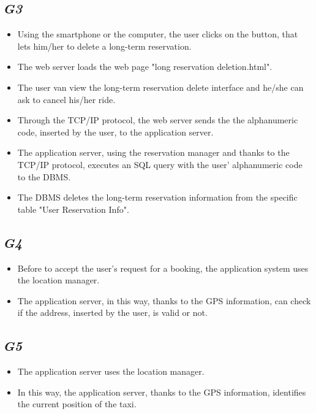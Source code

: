 	\subsection {\emph{G3}}
		\begin{itemize}
			\item Using the smartphone or the computer, the user clicks on the button, that lets him/her to delete a long-term reservation.
			\item The web server loads the web page "long reservation deletion.html".
			\item The user van view the long-term reservation delete interface and he/she can ask to cancel his/her ride.
			\item Through the TCP/IP protocol, the web server sends the the alphanumeric code, inserted by the user, to the application server.
			\item The application server, using the reservation manager and thanks to the TCP/IP protocol, executes an SQL query with the user' alphanumeric code to the DBMS.
			\item The DBMS deletes the long-term reservation information from the specific table "User Reservation Info".
		\end{itemize}
	\subsection {\emph{G4}}
		\begin{itemize}
			\item Before to accept the user's request for a booking, the application system uses the location manager.
			\item The application server, in this way, thanks to the GPS information, can check if the address, inserted by the user, is valid or not.
		\end{itemize}
	\subsection {\emph{G5}}
		\begin{itemize}
			\item The application server uses the location manager.
			\item In this way, the application server, thanks to the GPS information, identifies the current position of the taxi.
		\end{itemize}
